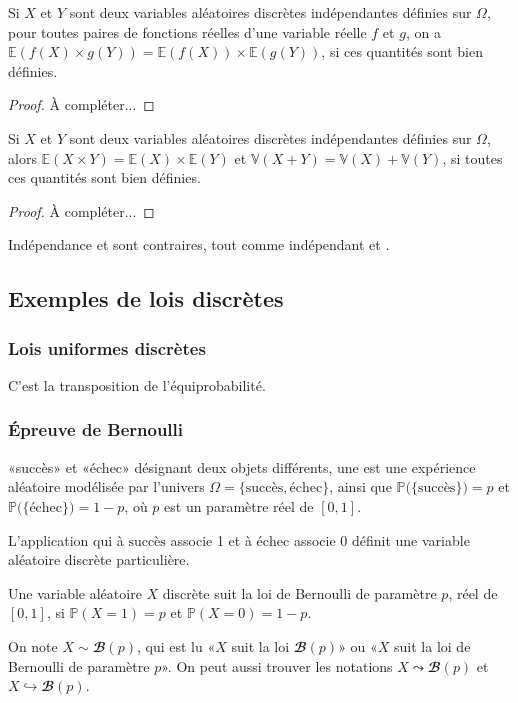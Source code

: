 %
\begin{lemma}
Si \(𝑋\) et \(𝑌\) sont deux variables aléatoires discrètes indépendantes définies sur \(Ω\), pour toutes paires de
fonctions réelles d'une variable réelle \(𝑓\) et \(𝑔\), on a \(𝔼(𝑓(𝑋)×𝑔(𝑌))=𝔼(𝑓(𝑋))×𝔼(𝑔(𝑌))\), si ces
quantités sont bien définies.
\end{lemma}
\begin{proof}
À compléter...
\end{proof}
\begin{proposition}
Si \(𝑋\) et \(𝑌\) sont deux variables aléatoires discrètes indépendantes définies sur \(Ω\), alors
\(𝔼(𝑋×𝑌)=𝔼(𝑋)×𝔼(𝑌)\) et \(𝕍(𝑋+𝑌)=𝕍(𝑋)+𝕍(𝑌)\), si toutes ces quantités sont bien définies.
\end{proposition}
\begin{proof}
À compléter...
\end{proof}
\begin{terminology}
Indépendance et  sont contraires, tout comme indépendant et
.
\end{terminology}
\subsection[Exemples de lois discrètes]{Exemples de lois discrètes}
\subsubsection{Lois uniformes discrètes}
C'est la transposition de l'équiprobabilité.
\subsubsection{Épreuve de Bernoulli}
\begin{definition}
«succès» et «échec» désignant deux objets différents,
une  est une expérience aléatoire modélisée par l'univers \(Ω=\{\text{succès},\text{échec}\}\), ainsi
que \(ℙ\bigl(\{\text{succès}\}\bigr)=𝑝\) et \(ℙ\bigl(\{\text{échec}\bigr\})=1-𝑝\), où \(𝑝\) est un paramètre réel de \([0,1]\).

L'application qui à \(\text{succès}\) associe 1 et à \(\text{échec}\) associe 0 définit une variable aléatoire discrète
particulière.
\end{definition}
\begin{definition}
Une variable aléatoire \(𝑋\) discrète suit la loi de Bernoulli de paramètre \(𝑝\), réel de \([0,1]\), si \(ℙ(𝑋=1)=𝑝\)
et \(ℙ(𝑋=0)=1-𝑝\).

On note \(𝑋∼𝓑(𝑝)\), qui est lu «\(𝑋\) suit la loi
\(𝓑(𝑝)\)» ou «\(𝑋\) suit la loi de Bernoulli de paramètre \(𝑝\)».
On peut aussi trouver les notations \(𝑋⤳𝓑(𝑝)\) et \(𝑋↪𝓑(𝑝)\).
\end{definition}

